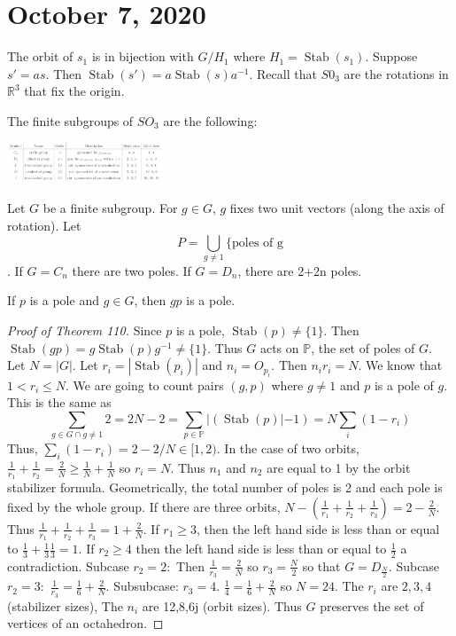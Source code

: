 \documentclass{article}
\newcommand{\R}{\mathbb{R}}
\DeclareMathOperator{\Stab}{Stab}
\begin{document}
\section{October 7, 2020}
The orbit of $s_1$ is in bijection with $G/H_1$ where $H_1=\Stab(s_1)$. Suppose $s'=as$. Then $\Stab(s')=a\Stab(s)a^{-1}$. Recall that $S0_3$ are the rotations in $\R^3$ that fix the origin. 
\begin{theorem}
The finite subgroups of $SO_3$ are the following:
    \begin{center}
        \includegraphics[width=0.35\textwidth]{Image 1 1072020.PNG}
    \end{center}
\end{theorem}
Let $G$ be a finite subgroup. For $g\in G$, $g$ fixes two unit vectors (along the axis of rotation). Let $$P=\bigcup_{g\neq 1}\{\textrm{poles of g}$$. If $G=C_n$ there are two poles. If $G=D_n$, there are 2+2n poles. 
\begin{lemma}
If $p$ is a pole and $g\in G$, then $gp$ is a  pole.
\end{lemma}
\begin{proof}[Proof of Theorem 110]
Since $p$ is a pole, $\Stab(p)\neq \{1\}$. Then $\Stab(gp)=g\Stab(p)g^{-1}\neq\{1\}$. Thus $G$ acts on $\mathbb{P}$, the set of poles of $G$. Let $N=|G|$. Let $r_i=|\Stab(p_i)|$ and $n_i=O_{p_i}$. Then $n_ir_i=N$. We know that $1<r_i\leq N$. We are going to count pairs $(g,p)$ where $g\neq 1$ and $p$ is a pole of $g$. This is the same as $$\sum_{g\in G\cap g\neq 1}2=2N-2=\sum_{p\in\mathbb{P}}|(\Stab(p)|-1)=N\sum_i(1-r_i)$$ Thus, $\sum_i(1-r_i)=2-2/N\in[1,2)$. In the case of two orbits, $\frac{1}{r_1}+\frac{1}{r_2}=\frac{2}{N}\geq \frac{1}{N}+\frac{1}{N}$ so $r_i=N$. Thus $n_1$ and $n_2$ are equal to 1 by the orbit stabilizer formula. Geometrically, the total number of poles is 2 and each pole is fixed by the whole group. If there are three orbits, $N-(\frac{1}{r_1}+\frac{1}{r_2}+\frac{1}{r_3})=2-\frac{2}{N}$. Thus $\frac{1}{r_1}+\frac{1}{r_2}+\frac{1}{r_3}=1+\frac{2}{N}$. If $r_1\geq 3$, then the left hand side is less than or equal to $\frac{1}{3}+\frac{1}{3}\frac{1}{3}=1$. If $r_2\geq 4$ then the left hand side is less than or equal to $\frac{1}{2}$ a contradiction. Subcase $r_2=2:$ Then $\frac{1}{r_3}=\frac{2}{N}$ so $r_3=\frac{N}{2}$ so that $G=D_{\frac{N}{2}}$. Subcase $r_2=3:$ $\frac{1}{r_3}=\frac{1}{6}+\frac{2}{N}$. Subsubcase: $r_3=4$. $\frac{1}{4}=\frac{1}{6}+\frac{2}{N}$ so $N=24$. The $r_i$ are $2,3,4$ (stabilizer sizes), The $n_i$ are 12,8,6j (orbit sizes). Thus $G$ preserves the set of vertices of an octahedron.
\end{proof}
\end{document}
